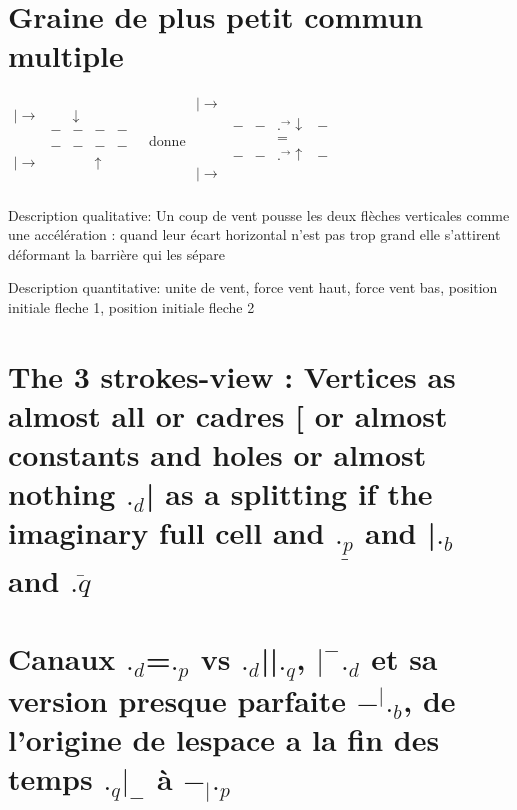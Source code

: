\documentclass{article}
\begin{document}
\section{Graine de plus petit commun multiple}
$
\begin{matrix}
| \longrightarrow&&\downarrow&&\\
                  &-&-&-&- \\
                  &&&&\\
                   &-&-&-&- \\
| \rightarrow&&&\uparrow&&\\                
\end{matrix}
$
donne 
$
\begin{matrix}
| \longrightarrow&&&&\\
                  &-&-&.^{\longrightarrow} \downarrow &- \\
                  & & &=& \\
                   &-&-&.^\rightarrow \uparrow            &- \\
| \rightarrow& & &&&\\                
\end{matrix}
$

Description qualitative: Un coup de vent pousse les deux flèches verticales comme une accélération : quand leur écart horizontal n'est pas trop grand elle s'attirent déformant la barrière qui les sépare

Description quantitative: unite de vent, force vent haut, force vent bas, position initiale fleche 1, position initiale fleche 2

\section{The 3 strokes-view : Vertices as almost all or cadres  [ or  almost constants and holes  or almost nothing  $._d$|  as a splitting if the imaginary full cell and %
 $\underline{._p}$ and |$._b$  and  $\overline{.q}$}

\section{ Canaux $._d$=$._p$ vs $._d$||$._q$,  $|^- ._d$ et sa version presque parfaite $-^|._b$,  de l'origine de lespace a la fin des temps
  $._q|_-$ à $-_|._p$ }
\end{document}
